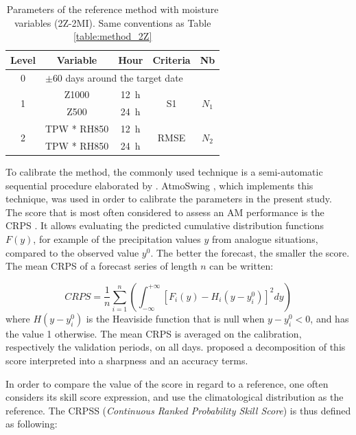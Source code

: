 \documentclass[hess]{copernicus}
\begin{document}
\begin{table}[htb]
	\caption{Parameters of the reference method with moisture variables (2Z-2MI). Same conventions as Table \ref{table:method_2Z}}
	\footnotesize
	\begin{center}
		\begin{tabular}{ccccc}
			\hline 
			Level & Variable & Hour & Criteria & Nb \\ 
			\hline 
			0 & \multicolumn{4}{l}{$\pm 60$ days around the target date} \\
			\hline 
			\multirow{2}{*}{1} & Z1000 & 12~h & \multirow{2}{*}{S1} & \multirow{2}{*}{$N_{1}$} \\
			& Z500 & 24~h & & \\ 
			\hline
			\multirow{2}{*}{2} & TPW * RH850 & 12~h & \multirow{2}{*}{RMSE} & \multirow{2}{*}{$N_{2}$} \\
			& TPW * RH850 & 24~h & & \\ 
			\hline 
		\end{tabular} 
	\end{center}
	\label{table:method_2Z-2MI}
\end{table}

To calibrate the method, the commonly used technique is a semi-automatic sequential procedure elaborated by \citet{Bontron2004}. AtmoSwing \citep{Horton2016}, which implements this technique, was used in order to calibrate the parameters in the present study. The score that is most often considered to assess an AM performance is the CRPS \citep[Continuous Ranked Probability Score,][]{Brown1974, Matheson1976, Hersbach2000}. It allows evaluating the predicted cumulative distribution functions $F(y)$, for example of the precipitation values $y$ from analogue situations, compared to the observed value $y^{0}$. The better the forecast, the smaller the score. The mean CRPS of a forecast series of length $n$ can be written:

\begin{equation}
\label{eq:CRPS}
CRPS = \frac{1}{n} \sum_{i=1}^{n} \left(  \int_{-\infty}^{+\infty} \left[ F_{i}(y)-H_{i}(y-y_{i}^{0})\right]^{2} dy \right) 
\end{equation}
where $H(y-y_{i}^{0})$ is the Heaviside function that is null when $y-y_{i}^{0}<0$, and has the value 1 otherwise. The mean CRPS is averaged on the calibration, respectively the validation periods, on all days. \citet{Bontron2004} proposed a decomposition of this score interpreted into a sharpness and an accuracy terms.

In order to compare the value of the score in regard to a reference, one often considers its skill score expression, and use the climatological distribution as the reference. The CRPSS (\textit{Continuous Ranked Probability Skill Score}) is thus defined as following:
\end{document}
